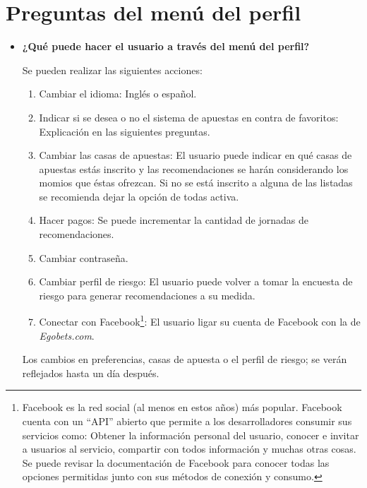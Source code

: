 \section{Preguntas del menú del perfil}
\begin{itemize}

\item \textbf{¿Qué puede hacer el usuario a través del menú del perfil?}


Se pueden realizar las siguientes acciones:
\begin{enumerate}

\item Cambiar el idioma: Inglés o español.
\item Indicar si se desea o no el sistema de apuestas en contra de favoritos: Explicación en las siguientes preguntas.
\item Cambiar las casas de apuestas: El usuario puede indicar en qué casas de apuestas estás inscrito y las recomendaciones se harán considerando los momios que éstas ofrezcan. Si no se está inscrito a alguna de las listadas se recomienda dejar la opción de todas activa.
\item Hacer pagos: Se puede incrementar la cantidad de jornadas de recomendaciones.
\item Cambiar contraseña.
\item Cambiar perfil de riesgo: El usuario puede volver a tomar la encuesta de riesgo para generar recomendaciones a su medida.
\item Conectar con Facebook\footnote{Facebook es la red social (al menos en estos años) más popular. Facebook cuenta con un ``API'' abierto que permite a los desarrolladores consumir sus servicios como: Obtener la información personal del usuario, conocer e invitar a usuarios al servicio, compartir con todos información y muchas otras cosas. Se puede revisar la documentación de Facebook \cite{facebookDocuWeb} para conocer todas las opciones permitidas junto con sus métodos de conexión y consumo.}: El usuario ligar su cuenta de Facebook con la de \emph{Egobets.com}.
\end{enumerate}

Los cambios en preferencias, casas de apuesta o el perfil de riesgo; se verán reflejados hasta un día después.
\end{itemize}

